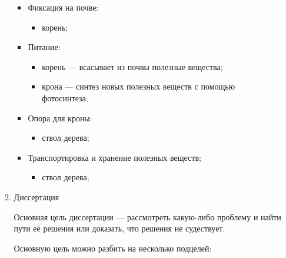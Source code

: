 \documentclass[10pt]{article}
\begin{document}
\begin{enumerate}
\begin{enumerate}
    \begin{itemize}
    \item{Фиксация на почве:}
      \begin{itemize}
      \item{корень;}
      \end{itemize}
    \item{Питание:}
      \begin{itemize}
      \item{корень --- всасывает из почвы полезные вещества;}
      \item{крона --- синтез новых полезных веществ с помощью фотосинтеза;}
      \end{itemize}
    \item{Опора для кроны:}
      \begin{itemize}
      \item{ствол дерева;}
      \end{itemize}
    \item{Транспортировка и хранение полезных веществ;}
      \begin{itemize}
        \item{ствол дерева;}
      \end{itemize}
    \end{itemize}

  \item{Диссертация}

    Основная цель диссертации --- рассмотреть какую-либо проблему и найти пути её решения или доказать, что решения не судествует.

    Основную цель можно разбить на несколько подцелей:


\end{enumerate}
\end{enumerate}
\end{document}
